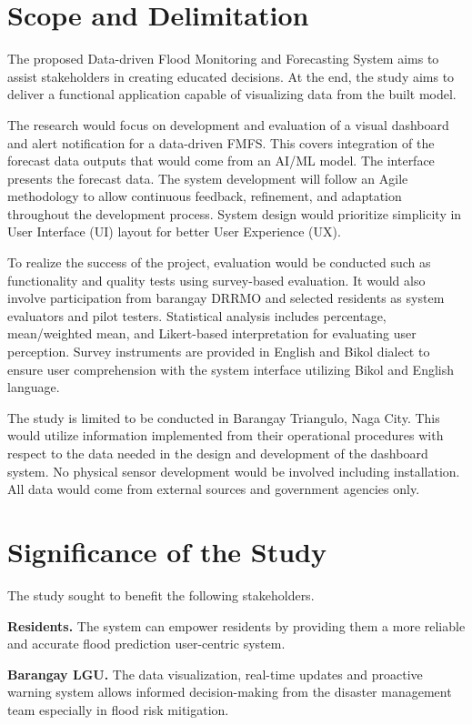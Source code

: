 \documentclass{research}
\begin{document}
\section{Scope and Delimitation}

The proposed Data-driven Flood Monitoring and Forecasting System aims to assist stakeholders in creating educated decisions. At the end, the study aims to deliver a functional application capable of visualizing data from the built model.

The research would focus on development and evaluation of a visual dashboard and alert notification for a data-driven FMFS. This covers integration of the forecast data outputs that would come from an AI/ML model. The interface presents the forecast data. The system development will follow an Agile methodology to allow continuous feedback, refinement, and adaptation throughout the development process. System design would prioritize simplicity in User Interface (UI) layout for better User Experience (UX).

To realize the success of the project, evaluation would be conducted such as functionality and quality tests using survey-based evaluation. It would also involve participation from barangay DRRMO and selected residents as system evaluators and pilot testers. Statistical analysis includes percentage, mean/weighted mean, and Likert-based interpretation for evaluating user perception. Survey instruments are provided in English and Bikol dialect to ensure user comprehension with the system interface utilizing Bikol and English language.

The study is limited to be conducted in Barangay Triangulo, Naga City. This would utilize information implemented from their operational procedures with respect to the data needed in the design and development of the dashboard system. No physical sensor development would be involved including installation. All data would come from external sources and government agencies only.

\section{Significance of the Study}

The study sought to benefit the following stakeholders.

\textbf{Residents.} The system can empower residents by providing them a more reliable and accurate flood prediction user-centric system.

\textbf{Barangay LGU.} The data visualization, real-time updates and proactive warning system allows informed decision-making from the disaster management team especially in flood risk mitigation.
\end{document}
